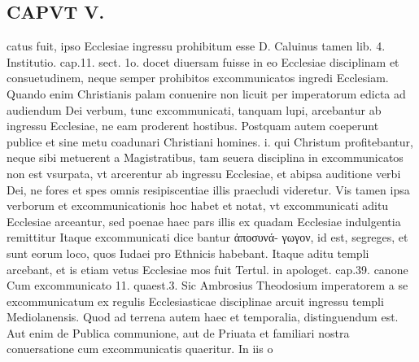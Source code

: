 \documentclass{article}
\begin{document}
\begin{pages}
\section*{CAPVT  V. }\pstart catus fuit, ipso Ecclesiae ingressu prohibitum esse D. Caluinus tamen lib.  4. Institutio. cap.11. sect. 1o. docet diuersam fuisse in eo Ecclesiae disciplinam et consuetudinem, neque semper prohibitos excommunicatos ingredi Ecclesiam. Quando enim Christianis palam conuenire non licuit per imperatorum edicta ad audiendum Dei verbum, tunc excommunicati, tanquam lupi, arcebantur ab ingressu Ecclesiae, ne eam proderent hostibus. Postquam autem coeperunt publice et sine metu coadunari Christiani homines. i. qui Christum profitebantur, neque sibi metuerent a Magistratibus, tam seuera disciplina in excommunicatos non est vsurpata, vt arcerentur ab ingressu Ecclesiae, et abipsa auditione verbi Dei, ne fores et spes omnis resipiscentiae illis praecludi videretur. Vis tamen ipsa verborum et excommunicationis hoc habet et notat, vt excommunicati aditu Ecclesiae arceantur, sed poenae haec pars illis ex quadam Ecclesiae indulgentia remittitur Itaque excommunicati dice bantur ἀποσυνά- γωγον, id est, segreges, et sunt eorum loco, quos Iudaei pro Ethnicis habebant. Itaque aditu templi arcebant, et is etiam vetus Ecclesiae mos fuit Tertul. in apologet. cap.39. canone Cum excommunicato 11. quaest.3. Sic Ambrosius Theodosium imperatorem a se excommunicatum ex regulis Ecclesiasticae disciplinae arcuit ingressu templi Mediolanensis. Quod ad terrena autem haec et temporalia, distinguendum est. Aut enim de Publica communione, aut de Priuata et familiari nostra conuersatione cum excommunicatis quaeritur. In iis o\pend

\end{pages}
\end{document}
